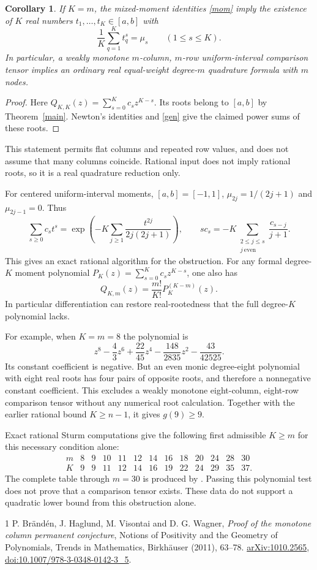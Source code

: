 \documentclass[11pt]{article}
\newtheorem{corollary}{Corollary}
\begin{document}
\begin{corollary}\label{square}
If $K=m$, the mixed-moment identities \eqref{mom} imply the existence
of $K$ real numbers $t_1,\ldots,t_K\in[a,b]$ with
\[
 \frac1K\sum_{q=1}^K t_q^s=\mu_s\qquad(1\le s\le K).
\]
In particular, a weakly monotone $m$-column, $m$-row uniform-interval
comparison tensor implies an ordinary real equal-weight degree-$m$
quadrature formula with $m$ nodes.
\end{corollary}
\begin{proof}
Here $Q_{K,K}(z)=\sum_{s=0}^K c_s z^{K-s}$. Its roots belong to
$[a,b]$ by Theorem~\ref{main}. Newton's identities and \eqref{gen}
give the claimed power sums of these roots.
\end{proof}
This statement permits flat columns and repeated row values, and does
not assume that many columns coincide. Rational input does not imply
rational roots, so it is a real quadrature reduction only.

For centered uniform-interval moments, $[a,b]=[-1,1]$,
$\mu_{2j}=1/(2j+1)$ and $\mu_{2j-1}=0$. Thus
\[
 \sum_{s\ge0}c_st^s
 =\exp\left(-K\sum_{j\ge1}\frac{t^{2j}}{2j(2j+1)}\right),
 \qquad
 s c_s=-K\sum_{\substack{2\le j\le s\\j\ \mathrm{even}}}
              \frac{c_{s-j}}{j+1}.
\]
This gives an exact rational algorithm for the obstruction. For any
formal degree-$K$ moment polynomial
$P_K(z)=\sum_{s=0}^K c_s z^{K-s}$, one also has
\[
 Q_{K,m}(z)=\frac{m!}{K!}P_K^{(K-m)}(z).
\]
In particular differentiation can restore real-rootedness that the
full degree-$K$ polynomial lacks.

For example, when $K=m=8$ the polynomial is
\[
 z^8-\frac43z^6+\frac{22}{45}z^4-\frac{148}{2835}z^2
       -\frac{43}{42525}.
\]
Its constant coefficient is negative. But an even monic degree-eight
polynomial with eight real roots has four pairs of opposite roots,
and therefore a nonnegative constant coefficient. This excludes a
weakly monotone eight-column, eight-row comparison tensor without
any numerical root calculation. Together with the earlier rational
bound $K\ge n-1$, it gives $g(9)\ge9$.

Exact rational Sturm computations give the following first admissible
$K\ge m$ for this necessary condition alone:
\[
\begin{array}{c|rrrrrrrrrrrr}
 m&8&9&10&11&12&14&16&18&20&24&28&30\\\hline
 K&9&9&11&12&14&16&19&22&24&29&35&37.
\end{array}
\]
The complete table through $m=30$ is produced by
. Passing this polynomial test does
not prove that a comparison tensor exists. These data do not support
a quadratic lower bound from this obstruction alone.

\begin{thebibliography}{1}
P. Br\"and\'en, J. Haglund, M. Visontai and D. G. Wagner,
\emph{Proof of the monotone column permanent conjecture},
Notions of Positivity and the Geometry of Polynomials,
Trends in Mathematics, Birkh\"auser (2011), 63--78.
\href{https://arxiv.org/abs/1010.2565}{arXiv:1010.2565},
\href{https://doi.org/10.1007/978-3-0348-0142-3_5}{doi:10.1007/978-3-0348-0142-3\_5}.
\end{thebibliography}
\end{document}
